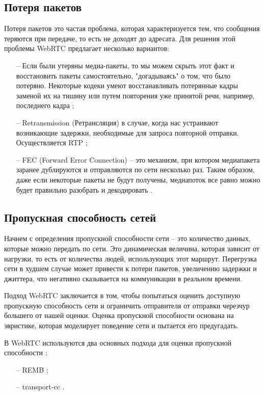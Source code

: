 \subsection{Потеря пакетов}

Потеря пакетов это частая проблема, которая характеризуется тем, что сообщения теряются при передаче, то есть не доходят до адресата. Для решения этой проблемы WebRTC предлагает несколько вариантов:
\begin{itemize}
	\item[--] Если были утеряны медиа-пакеты, то мы можем скрыть этот факт и восстановить пакеты самостоятельно, "догадываясь" о том, что было потеряно. Некоторые кодеки умеют восстанавливать потерянные кадры заменой их на тишину или путем повторения уже принятой речи, например, последнего кадра \cite{v8};
	\item[--] Retransmission (Ретрансляция) в случае, когда нас устраивают возникающие задержки, необходимые для запроса повторной отправки. Осуществляется RTP \cite{v9};
        \item[--] FEC (Forward Error Connection) -- это механизм, при котором медиапакета заранее дублируются и отправляются по сети несколько раз. Таким образом, даже если некоторые пакеты не будут получены, медиапоток все равно можно будет правильно разобрать и декодировать \cite{v10}.
\end{itemize}

\subsection{Пропускная способность сетей}

Начнем с определения пропускной способности сети -- это количество данных, которые можно передать по сети. Это динамическая величина, которая зависит от нагрузки, то есть от количества людей, использующих этот маршрут. Перегрузка сети в худшем случае может привести к потери пакетов, увеличению задержки и джиттера, что негативно сказывается на коммуникации в реальном времени.

Подход WebRTC заключается в том, чтобы попытаться оценить доступную пропускную способность сети и ограничить отправителя от отправки черезчур большего от нашей оценки. Оценка пропускной способности основана на эвристике, которая моделирует поведение сети и пытается его предугадать.

В WebRTC используются два основных подхода для оценки пропускной способности \cite{v5}:
\begin{itemize}
	\item[--] REMB \cite{v6};
	\item[--] transport-cc \cite{v7}.
\end{itemize}

